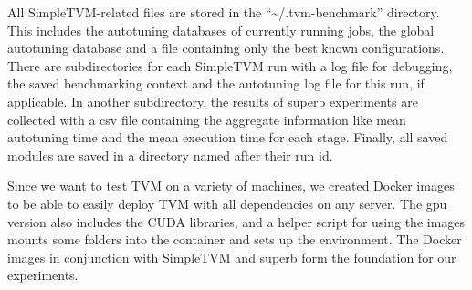 All SimpleTVM-related files are stored in the \enquote{\textasciitilde /.tvm-benchmark} directory. This includes the autotuning databases of currently running jobs, the global autotuning database and a file containing only the best known configurations. There are subdirectories for each SimpleTVM run with a log file for debugging, the saved benchmarking context and the autotuning log file for this run, if applicable. In another subdirectory, the results of superb experiments are collected with a csv file containing the aggregate information like mean autotuning time and the mean execution time for each stage. Finally, all saved modules are saved in a directory named after their run id.

Since we want to test TVM on a variety of machines, we created Docker images to be able to easily deploy TVM with all dependencies on any server. The \gls{gpu} version also includes the CUDA libraries, and a helper script for using the images mounts some folders into the container and sets up the environment. The Docker images in conjunction with SimpleTVM and superb form the foundation for our experiments.


